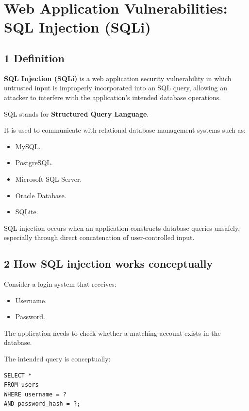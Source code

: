 \section{Web Application Vulnerabilities: SQL Injection (SQLi)}


\subsection{1 Definition}

\textbf{SQL Injection (SQLi)} is a web application security vulnerability in which untrusted input is improperly incorporated into an SQL query, allowing an attacker to interfere with the application's intended database operations.

SQL stands for \textbf{Structured Query Language}.

It is used to communicate with relational database management systems such as:

\begin{itemize}
\item MySQL.
\item PostgreSQL.
\item Microsoft SQL Server.
\item Oracle Database.
\item SQLite.
\end{itemize}

SQL injection occurs when an application constructs database queries unsafely, especially through direct concatenation of user-controlled input.

\subsection{2 How SQL injection works conceptually}

Consider a login system that receives:

\begin{itemize}
\item Username.
\item Password.
\end{itemize}

The application needs to check whether a matching account exists in the database.

The intended query is conceptually:

\begin{lstlisting}
SELECT *
FROM users
WHERE username = ?
AND password_hash = ?;
\end{lstlisting}

